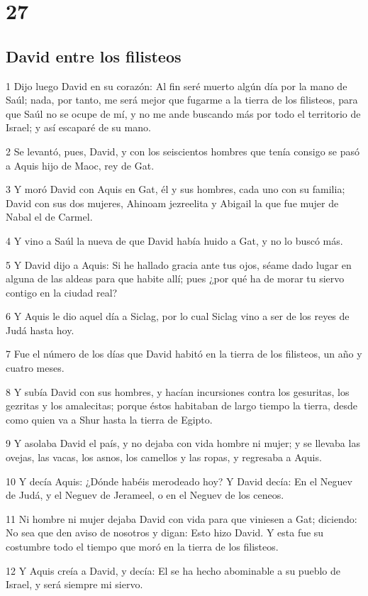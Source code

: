 \chapter{27}

\section*{David entre los filisteos}

\par 1 Dijo luego David en su corazón: Al fin seré muerto algún día por la mano de Saúl; nada, por tanto, me será mejor que fugarme a la tierra de los filisteos, para que Saúl no se ocupe de mí, y no me ande buscando más por todo el territorio de Israel; y así escaparé de su mano.
\par 2 Se levantó, pues, David, y con los seiscientos hombres que tenía consigo se pasó a Aquis hijo de Maoc, rey de Gat.
\par 3 Y moró David con Aquis en Gat, él y sus hombres, cada uno con su familia; David con sus dos mujeres, Ahinoam jezreelita y Abigail la que fue mujer de Nabal el de Carmel.
\par 4 Y vino a Saúl la nueva de que David había huido a Gat, y no lo buscó más.
\par 5 Y David dijo a Aquis: Si he hallado gracia ante tus ojos, séame dado lugar en alguna de las aldeas para que habite allí; pues ¿por qué ha de morar tu siervo contigo en la ciudad real?
\par 6 Y Aquis le dio aquel día a Siclag, por lo cual Siclag vino a ser de los reyes de Judá hasta hoy.
\par 7 Fue el número de los días que David habitó en la tierra de los filisteos, un año y cuatro meses.
\par 8 Y subía David con sus hombres, y hacían incursiones contra los gesuritas, los gezritas y los amalecitas; porque éstos habitaban de largo tiempo la tierra, desde como quien va a Shur hasta la tierra de Egipto.
\par 9 Y asolaba David el país, y no dejaba con vida hombre ni mujer; y se llevaba las ovejas, las vacas, los asnos, los camellos y las ropas, y regresaba a Aquis.
\par 10 Y decía Aquis: ¿Dónde habéis merodeado hoy? Y David decía: En el Neguev de Judá, y el Neguev de Jerameel, o en el Neguev de los ceneos.
\par 11 Ni hombre ni mujer dejaba David con vida para que viniesen a Gat; diciendo: No sea que den aviso de nosotros y digan: Esto hizo David. Y esta fue su costumbre todo el tiempo que moró en la tierra de los filisteos.
\par 12 Y Aquis creía a David, y decía: El se ha hecho abominable a su pueblo de Israel, y será siempre mi siervo.

